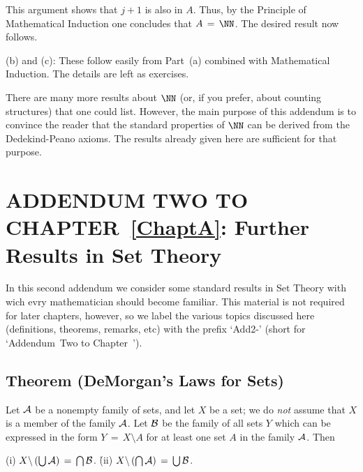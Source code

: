 {    This argument shows that $j+1$ is also in $A$. Thus, by the Principle of Mathematical Induction one concludes that $A \,=\, {\NN}$. The desired result now follows.

\V

        (b) and (c): These follow easily from Part~(a) combined with Mathematical Induction. The details are left as exercises.

\VV

        There are many more results about ${\NN}$ (or, if you prefer, about counting structures) that one could list.
    However, the main purpose of this addendum is to convince the reader  that the standard properties of ${\NN}$ can be derived from the Dedekind-Peano axioms.
    The results already given here are sufficient for that purpose.

\newpage

                        \section{ADDENDUM TWO TO CHAPTER~\ref{ChaptA}: Further Results in Set Theory}
                        \label{SectAAdd2}

\VV

        In this second addendum we consider some standard results in Set Theory with wich evry mathematician should become familiar.
    This material is not required for later chapters, however, so we label the various topics discussed here (definitions, theorems, remarks, etc)
    with the prefix `Add2-' (short for `Addendum~Two to Chapter~').

\VV

                 \subsection{\small{\bf Theorem (DeMorgan's Laws for Sets)}}

        Let ${\cal A}$ be a nonempty family of sets, and let $X$ be a set; we do {\em not} assume that $X$ is a member of the family ${\cal A}$.
    Let ${\cal B}$ be the family of all sets $Y$ which can be expressed in the form $Y \,=\, X{\setminus}A$ for at least one set $A$ in the family ${\cal A}$. Then

\V

        (i) $X{\setminus}\left({\bigcup}\, {\cal A}\right) \,=\, {\bigcap}\, {\cal B}$.
    \h
        (ii) $X{\setminus}\left({\bigcap}\, {\cal A}\right) \,=\, {\bigcup}\, {\cal B}$.

}
